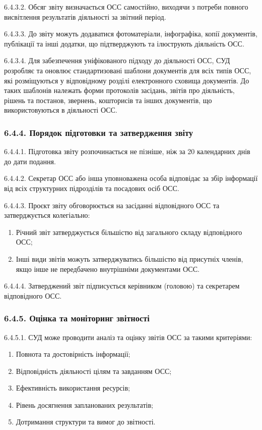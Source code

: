         6.4.3.2. Обсяг звіту визначається ОСС самостійно, виходячи з потреби повного висвітлення результатів діяльності за звітний період.
        
        6.4.3.3. До звіту можуть додаватися фотоматеріали, інфографіка, копії документів, публікації та інші додатки, що підтверджують та ілюструють діяльність ОСС.
        
        6.4.3.4. Для забезпечення уніфікованого підходу до діяльності ОСС, СУД розробляє та оновлює стандартизовані шаблони документів для всіх типів ОСС, які розміщуються у відповідному розділі електронного сховища документів. До таких шаблонів належать форми протоколів засідань, звітів про діяльність, рішень та постанов, звернень, кошторисів та інших документів, що використовуються в діяльності ОСС.

    \subsubsection*{6.4.4. Порядок підготовки та затвердження звіту}
        6.4.4.1. Підготовка звіту розпочинається не пізніше, ніж за 20 календарних днів до дати подання.
        
        6.4.4.2. Секретар ОСС або інша уповноважена особа відповідає за збір інформації від всіх структурних підрозділів та посадових осіб ОСС.
        
        6.4.4.3. Проєкт звіту обговорюється на засіданні відповідного ОСС та затверджується колегіально:

            \begin{enumerate}[label=\alph*)]
                \item Річний звіт затверджується більшістю від загального складу відповідного ОСС;
                \item Інші види звітів можуть затверджуватись більшістю від присутніх членів, якщо інше не передбачено внутрішніми документами ОСС.
            \end{enumerate}
            
        6.4.4.4. Затверджений звіт підписується керівником (головою) та секретарем відповідного ОСС.

    \subsubsection*{6.4.5. Оцінка та моніторинг звітності}
        6.4.5.1. СУД може проводити аналіз та оцінку звітів ОСС за такими критеріями:

            \begin{enumerate}[label=\alph*)]
                \item Повнота та достовірність інформації;
                \item Відповідність діяльності цілям та завданням ОСС;
                \item Ефективність використання ресурсів;
                \item Рівень досягнення запланованих результатів;
                \item Дотримання структури та вимог до звітності.
            \end{enumerate}
            
